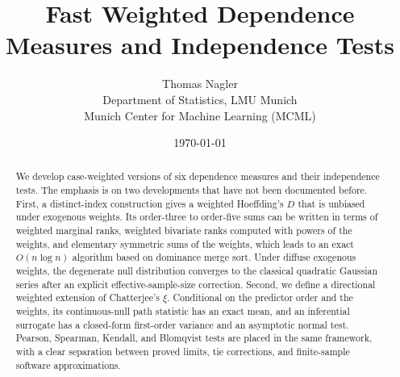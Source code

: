 \documentclass[11pt]{article}
\title{Fast Weighted Dependence Measures and Independence Tests}
\author{Thomas Nagler \\[12pt] \small Department of Statistics, LMU Munich \\ \small Munich Center for Machine Learning (MCML)}
\date{\today}
\begin{document}
\maketitle

\begin{abstract}
We develop case-weighted versions of six dependence measures and their
independence tests. The emphasis is on two developments that have not been
documented before. First, a distinct-index construction gives a weighted
Hoeffding's $D$ that is unbiased under exogenous weights. Its order-three to
order-five sums can be written in terms of weighted marginal ranks, weighted
bivariate ranks computed with powers of the weights, and elementary symmetric
sums of the weights, which leads to an exact $O(n\log n)$ algorithm based on
dominance merge sort. Under diffuse exogenous weights, the degenerate null
distribution converges to the classical quadratic Gaussian series after an
explicit effective-sample-size correction. Second, we define a directional
weighted extension of Chatterjee's $\xi$. Conditional on the predictor order
and the weights, its continuous-null path statistic has an exact mean, and an
inferential surrogate has a closed-form first-order variance and an asymptotic
normal test. Pearson, Spearman, Kendall, and Blomqvist tests are placed in the
same framework, with a clear separation between proved limits, tie
corrections, and finite-sample software approximations.
\end{abstract}









\clearpage
\appendix








\end{document}
